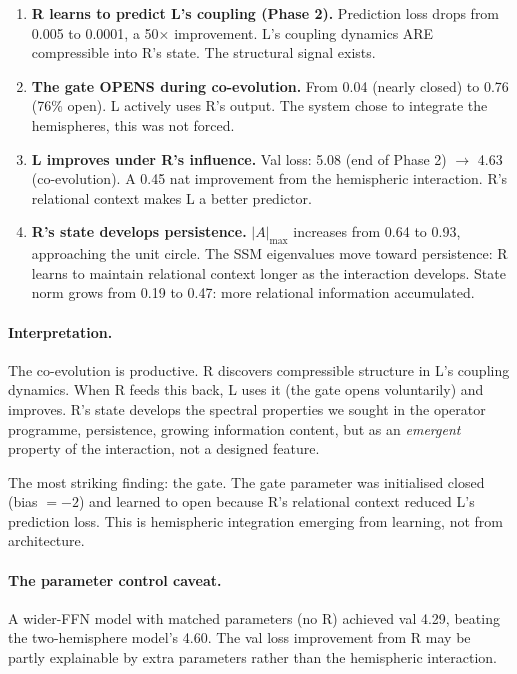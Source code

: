 \documentclass[11pt, a4paper]{article}
\theoremstyle{plain}
\theoremstyle{definition}
\theoremstyle{remark}
\begin{document}
\begin{enumerate}[nosep]
\item \textbf{R learns to predict L's coupling (Phase 2).}
Prediction loss drops from 0.005 to 0.0001, a 50$\times$ improvement.
L's coupling dynamics ARE compressible into R's state.
The structural signal exists.

\item \textbf{The gate OPENS during co-evolution.}
From 0.04 (nearly closed) to 0.76 (76\% open).
L actively uses R's output.
The system chose to integrate the hemispheres, this was not forced.

\item \textbf{L improves under R's influence.}
Val loss: 5.08 (end of Phase 2) $\to$ 4.63 (co-evolution).
A 0.45 nat improvement from the hemispheric interaction.
R's relational context makes L a better predictor.

\item \textbf{R's state develops persistence.}
$|A|_{\max}$ increases from 0.64 to 0.93, approaching the unit circle.
The SSM eigenvalues move toward persistence: R learns to maintain relational context longer as the interaction develops.
State norm grows from 0.19 to 0.47: more relational information accumulated.
\end{enumerate}

\paragraph{Interpretation.}
The co-evolution is productive.
R discovers compressible structure in L's coupling dynamics.
When R feeds this back, L uses it (the gate opens voluntarily) and improves.
R's state develops the spectral properties we sought in the operator programme, persistence, growing information content, but as an \emph{emergent} property of the interaction, not a designed feature.

The most striking finding: the gate.
The gate parameter was initialised closed (bias $= -2$) and learned to open because R's relational context reduced L's prediction loss.
This is hemispheric integration emerging from learning, not from architecture.

\paragraph{The parameter control caveat.}
A wider-FFN model with matched parameters (no R) achieved val 4.29, beating the two-hemisphere model's 4.60.
The val loss improvement from R may be partly explainable by extra parameters rather than the hemispheric interaction.
\end{document}
